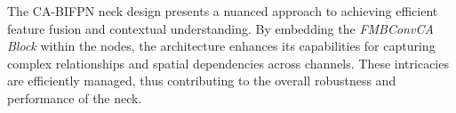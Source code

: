 The CA-BIFPN neck design presents a nuanced approach to achieving efficient feature fusion and contextual understanding. By embedding the \textit{FMBConvCA Block} within the nodes, the architecture enhances its capabilities for capturing complex relationships and spatial dependencies across channels. These intricacies are efficiently managed, thus contributing to the overall robustness and performance of the neck.